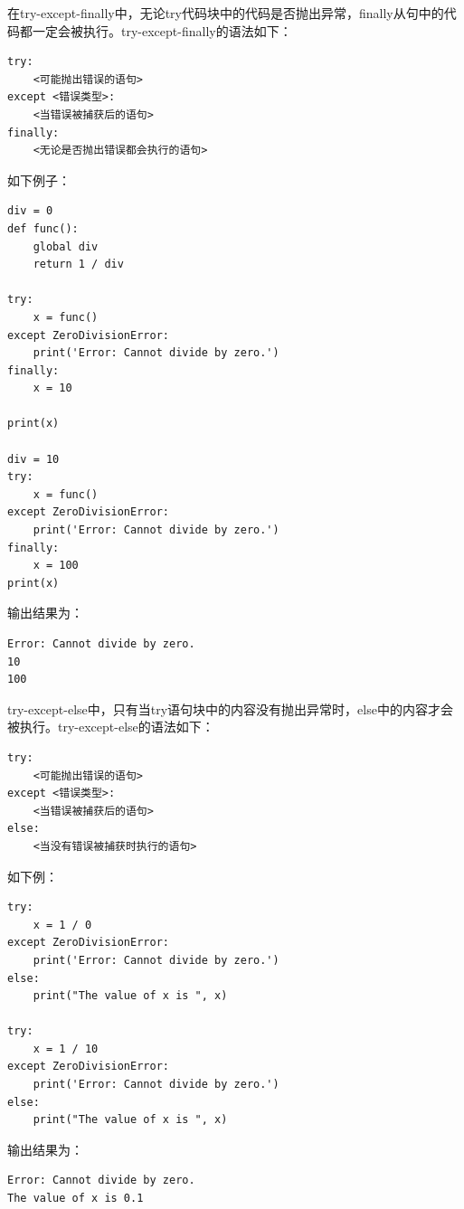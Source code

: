 \documentclass[../../Main.tex]{subfiles}
\begin{document}
在try-except-finally中，无论try代码块中的代码是否抛出异常，finally从句中的代码都一定会被执行。try-except-finally的语法如下：
\begin{lstlisting}
try:
    <可能抛出错误的语句>
except <错误类型>:
    <当错误被捕获后的语句>
finally:
    <无论是否抛出错误都会执行的语句>
\end{lstlisting}

如下例子：

\begin{lstlisting}
div = 0
def func():
    global div
    return 1 / div

try:
    x = func()
except ZeroDivisionError:
    print('Error: Cannot divide by zero.')
finally:
    x = 10

print(x)

div = 10
try:
    x = func()
except ZeroDivisionError:
    print('Error: Cannot divide by zero.')
finally:
    x = 100
print(x)
\end{lstlisting}

输出结果为：
\begin{lstlisting}
Error: Cannot divide by zero.
10
100
\end{lstlisting}

try-except-else中，只有当try语句块中的内容没有抛出异常时，else中的内容才会被执行。try-except-else的语法如下：
\begin{lstlisting}
try:
    <可能抛出错误的语句>
except <错误类型>:
    <当错误被捕获后的语句>
else:
    <当没有错误被捕获时执行的语句>
\end{lstlisting}

如下例：

\begin{lstlisting}
try:
    x = 1 / 0
except ZeroDivisionError:
    print('Error: Cannot divide by zero.')
else:
    print("The value of x is ", x)

try:
    x = 1 / 10
except ZeroDivisionError:
    print('Error: Cannot divide by zero.')
else:
    print("The value of x is ", x)
\end{lstlisting}

输出结果为：

\begin{lstlisting}
Error: Cannot divide by zero.
The value of x is 0.1
\end{lstlisting}
\end{document}
